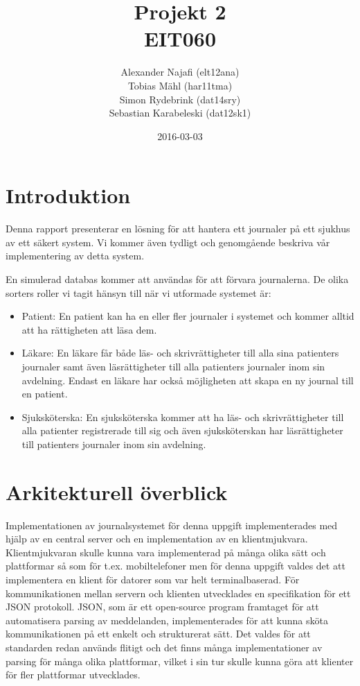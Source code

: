 \documentclass[a4paper]{article}
\title{Projekt 2\\ EIT060}
\author{Alexander Najafi (elt12ana)\\Tobias Mähl (har11tma)\\Simon Rydebrink (dat14sry)\\ Sebastian Karabeleski (dat12sk1)}
\date{2016-03-03}
\begin{document}
\maketitle
\newpage

\tableofcontents
\newpage

\section{Introduktion}
Denna rapport presenterar en lösning för att hantera ett journaler på ett sjukhus av ett säkert system. Vi kommer även tydligt och genomgående beskriva vår implementering av detta system.

En simulerad databas kommer att användas för att förvara journalerna. De olika sorters roller vi tagit hänsyn till när vi utformade systemet är:

\begin{itemize}
\item
Patient: En patient kan ha en eller fler journaler i systemet och kommer alltid att ha rättigheten att läsa dem. 

\item
Läkare: En läkare får både läs- och skrivrättigheter till alla sina patienters journaler samt även läsrättigheter till alla patienters journaler inom sin avdelning. Endast en läkare har också möjligheten att skapa en ny journal till en patient.

\item
Sjuksköterska: En sjuksköterska kommer att ha läs- och skrivrättigheter till alla patienter registrerade till sig och även sjuksköterskan har läsrättigheter till patienters journaler inom sin avdelning.
\end{itemize}

\section{Arkitekturell överblick}
Implementationen av journalsystemet för denna uppgift implementerades med hjälp av en central server och en implementation av en klientmjukvara. Klientmjukvaran skulle kunna vara implementerad på många olika sätt och plattformar så som för t.ex. mobiltelefoner men för denna uppgift valdes det att implementera en klient för datorer som var helt terminalbaserad. För kommunikationen mellan servern och klienten utvecklades en specifikation för ett JSON protokoll. JSON, som är ett open-source program framtaget för att automatisera parsing av meddelanden, implementerades för att kunna sköta kommunikationen på ett enkelt och strukturerat sätt. Det valdes för att standarden redan används flitigt och det finns många implementationer av parsing för många olika plattformar, vilket i sin tur skulle kunna göra att klienter för fler plattformar utvecklades.
\end{document}
